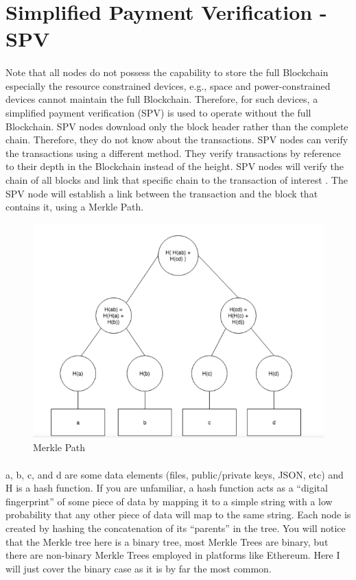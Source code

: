 \section{Simplified Payment Verification - SPV}
\paragraph{}Note that all nodes do not possess the capability to store the
full Blockchain especially the resource constrained devices,
e.g., space and power-constrained devices cannot maintain the
full Blockchain. Therefore, for such devices, a simplified
payment verification (SPV) is used to operate without the full
Blockchain. SPV nodes download only the block header rather
than the complete chain. Therefore, they do not know about the
transactions.
SPV nodes can verify the transactions using a different
method. They verify transactions by reference to their depth in
the Blockchain instead of the height. SPV nodes will verify the
chain of all blocks and link that specific chain to the
transaction of interest . The SPV node will establish a link
between the transaction and the block that contains it, using a
Merkle Path.


\begin{figure}[H]
	\centering
	\includegraphics[scale=0.5]{merkle_path.png}
	\caption{Merkle Path}
\end{figure}


\paragraph{}a, b, c, and d are some data elements (files, public/private keys, JSON, etc) and H is a hash function. If you are unfamiliar, a hash function acts as a “digital fingerprint” of some piece of data by mapping it to a simple string with a low probability that any other piece of data will map to the same string. Each node is created by hashing the concatenation of its “parents” in the tree. You will notice that the Merkle tree here is a binary tree, most Merkle Trees are binary, but there are non-binary Merkle Trees employed in platforms like Ethereum. Here I will just cover the binary case as it is by far the most common.
